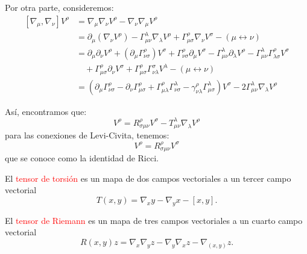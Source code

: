 \documentclass[../main]{subfiles}
\begin{document}
Por otra parte, consideremos:
\begin{equation}
    \begin{split}
        [\nabla_{\mu}, \nabla_{\nu}]V^{\rho}&=\nabla_{\mu}\nabla_{\nu} V^{\rho}-\nabla_{\nu}\nabla_{\mu}V^{\rho}\\
        &=\partial_{\mu}(\nabla_{\nu}V^{\rho})-\Gamma^{\lambda}_{\mu\nu}\nabla_{\lambda}V^{\rho}+\Gamma^{\rho}_{\mu\sigma}\nabla_{\nu}V^{\sigma}-(\mu \leftrightarrow \nu)\\
        &=\partial_{\mu}\partial_{\nu}V^{\rho}+(\partial_{\mu}\Gamma^{\rho}_{\nu\sigma})V^{\sigma}+\Gamma^{\rho}_{\nu\sigma}\partial_{\mu}V^{\sigma}-\Gamma^{\lambda}_{\mu\nu}\partial_{\lambda}V^{\rho}-\Gamma^{\lambda}_{\mu\nu}\Gamma^{\rho}_{\lambda\sigma}V^{\sigma}\\
        &\quad +\Gamma^{\rho}_{\mu\sigma}\partial_{\nu}V^{\sigma}+\Gamma^{\rho}_{\mu\sigma}\Gamma^{\sigma}_{\nu\lambda}V^{\lambda}-(\mu \leftrightarrow \nu)\\
        &=(\partial_{\mu}\Gamma^{\rho}_{\nu\sigma}-\partial_{\nu}\Gamma^{\rho}_{\mu\sigma}+\Gamma^{\rho}_{\mu\lambda}\Gamma^{\lambda}_{\nu\sigma}-\gamma^{\rho}_{\nu\lambda}\Gamma^{\lambda}_{\mu\sigma})V^{\sigma}-2\Gamma^{\lambda}_{\mu\nu}\nabla_{\lambda}V^{\rho}
    \end{split}
\end{equation}

Así, encontramos que:
\begin{equation}
    [\nabla_{\mu}, \nabla_{\nu}]V^{\rho}=R^{\rho}_{\sigma\mu\nu}V^{\sigma}-T^{\lambda}_{\mu\nu}\nabla_{\lambda}V^{\rho}
\end{equation}
para las conexiones de Levi-Civita, tenemos:
\begin{equation}
    [\nabla_{\mu}, \nabla_{\nu}]V^{\rho}=R^{\rho}_{\sigma\mu\nu}V^{\sigma}
\end{equation}
que se conoce como la identidad de Ricci.

 El \textcolor{red}{tensor de torsión} es un mapa de dos campos vectoriales a un tercer campo vectorial 
\begin{equation}
    T(x, y)=\nabla_x y-\nabla_y x-[x, y].
\end{equation}

 El \textcolor{red}{tensor de Riemann} es un mapa de tres campos vectoriales a un cuarto campo vectorial
\begin{equation}
    R(x, y)z=\nabla_x \nabla_y z-\nabla_y \nabla_x z-\nabla_{(x, y)}z.
\end{equation}
\end{document}
